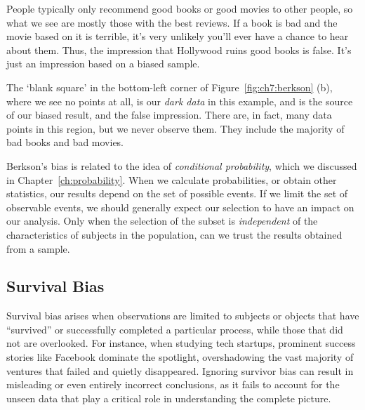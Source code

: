 \begin{example}
People typically only recommend good books or good movies to other
people, so what we see are mostly those with the best reviews. If a book is
bad and the movie based on it is terrible, it's very unlikely you'll ever have
a chance to hear about them. Thus, the impression that Hollywood ruins good books is
false. It's just an impression based on a biased sample. 

The `blank square' in the bottom-left corner of Figure~\ref{fig:ch7:berkson} (b), where we see no
points at all, is our \emph{dark data} in this example, and is the source of
our biased result, and the false impression. There are, in fact, many data
points in this region, but we never observe them. They include the majority of
bad books and bad movies.
\end{example}

Berkson's bias is related to the idea of \emph{conditional probability},
which we discussed in Chapter~\ref{ch:probability}. When we calculate probabilities, or
obtain other statistics, our results depend on the  set of possible events. If we limit 
the set of observable events, we should generally expect our selection to have
an impact on our analysis. Only when the selection of the subset is \emph{independent}
of the characteristics of subjects in the population, can we trust the results obtained
from a sample.

\subsection{Survival Bias}\label{survival-bias}

Survival bias arises when observations are limited to subjects or objects that
have ``survived'' or successfully completed a particular process, while those
that did not are overlooked. For instance, when studying tech startups, prominent success stories like
Facebook dominate the spotlight, overshadowing the vast majority of ventures
that failed and quietly disappeared. Ignoring survivor bias can result in misleading
or even entirely incorrect conclusions, as it fails to account for the unseen
data that play a critical role in understanding the complete picture.

